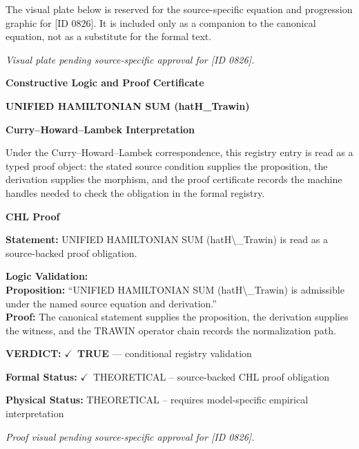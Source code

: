 \begingroup\footnotesize\sloppy
The visual plate below is reserved for the source-specific equation and progression graphic for [ID 0826]. It is included only as a companion to the canonical equation, not as a substitute for the formal text.
\par\endgroup
\begingroup\footnotesize\itshape
Visual plate pending source-specific approval for [ID 0826].
\par\endgroup

\clearpage
\begingroup\tzpsupportsetup
\noindent\textbf{\fontsize{10.8pt}{12.8pt}\selectfont [ID 0826] Constructive Logic and Proof Certificate}\par
\noindent\textbf{\fontsize{10pt}{12pt}\selectfont UNIFIED HAMILTONIAN SUM (hatH\_Trawin)}\par
\vspace{0.45em}
\begingroup
\footnotesize
\setlength{\parskip}{0.22em}
\setlength{\parindent}{0pt}
\noindent\textbf{Curry--Howard--Lambek Interpretation}\par
Under the Curry--Howard--Lambek correspondence, this registry entry is read as a typed proof
object: the stated source condition supplies the proposition, the derivation supplies the
morphism, and the proof certificate records the machine handles needed to check the obligation
in the formal registry.

\vspace{0.45em}
\noindent\textbf{CHL Proof}\par
\textbf{Statement:} UNIFIED HAMILTONIAN SUM (hatH\textbackslash{}\_Trawin) is read as a source-backed proof obligation.

\textbf{Logic Validation:}\\
\textbf{Proposition:} ``UNIFIED HAMILTONIAN SUM (hatH\textbackslash{}\_Trawin) is admissible under the named source equation and derivation.''\\
\textbf{Proof:} The canonical statement supplies the proposition, the derivation supplies the witness, and the TRAWIN operator chain records the normalization path.

\textbf{VERDICT:} \ensuremath{\checkmark}\ \textbf{TRUE} --- conditional registry validation

\textbf{Formal Status:} \ensuremath{\checkmark}\ THEORETICAL -- source-backed CHL proof obligation

\textbf{Physical Status:} THEORETICAL -- requires model-specific empirical interpretation
\par\vspace{0.45em}
\par
\vfill
\begingroup\footnotesize\itshape
Proof visual pending source-specific approval for [ID 0826].
\par\endgroup
\vfill
\endgroup
\endgroup
